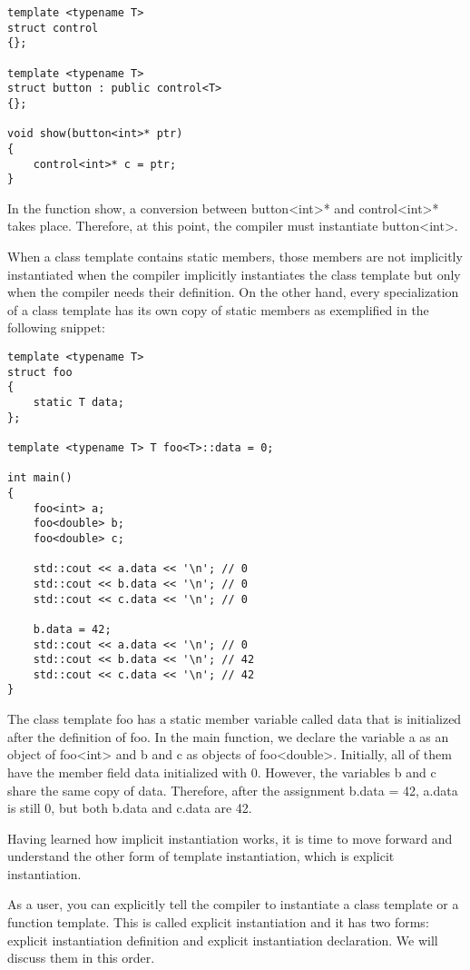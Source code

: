 \begin{lstlisting}[style=styleCXX]
template <typename T>
struct control
{};

template <typename T>
struct button : public control<T>
{};

void show(button<int>* ptr)
{
	control<int>* c = ptr;
}
\end{lstlisting}

In the function show, a conversion between button<int>* and control<int>* takes place. Therefore, at this point, the compiler must instantiate button<int>.

When a class template contains static members, those members are not implicitly instantiated when the compiler implicitly instantiates the class template but only when the compiler needs their definition. On the other hand, every specialization of a class template has its own copy of static members as exemplified in the following snippet:

\begin{lstlisting}[style=styleCXX]
template <typename T>
struct foo
{
	static T data;
};

template <typename T> T foo<T>::data = 0;

int main()
{
	foo<int> a;
	foo<double> b;
	foo<double> c;
	
	std::cout << a.data << '\n'; // 0
	std::cout << b.data << '\n'; // 0
	std::cout << c.data << '\n'; // 0
	
	b.data = 42;
	std::cout << a.data << '\n'; // 0
	std::cout << b.data << '\n'; // 42
	std::cout << c.data << '\n'; // 42
}
\end{lstlisting}

The class template foo has a static member variable called data that is initialized after the definition of foo. In the main function, we declare the variable a as an object of foo<int> and b and c as objects of foo<double>. Initially, all of them have the member field data initialized with 0. However, the variables b and c share the same copy of data. Therefore, after the assignment b.data = 42, a.data is still 0, but both b.data and c.data are 42.

Having learned how implicit instantiation works, it is time to move forward and understand the other form of template instantiation, which is explicit instantiation.


As a user, you can explicitly tell the compiler to instantiate a class template or a function template. This is called explicit instantiation and it has two forms: explicit instantiation definition and explicit instantiation declaration. We will discuss them in this order.


